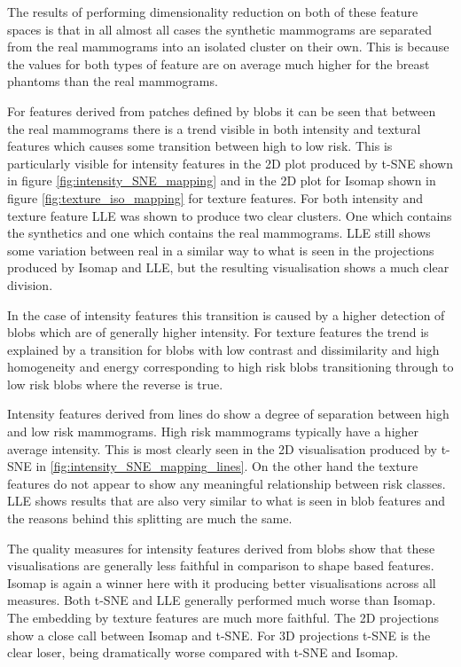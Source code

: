 The results of performing dimensionality reduction on both of these feature spaces is that in all almost all cases the synthetic mammograms are separated from the real mammograms into an isolated cluster on their own. This is because the values for both types of feature are on average much higher for the breast phantoms than the real mammograms.

For features derived from patches defined by blobs it can be seen that between the real mammograms there is a trend visible in both intensity and textural features which causes some transition between high to low risk. This is particularly visible for intensity features in the 2D plot produced by t-SNE shown in figure \ref{fig:intensity_SNE_mapping} and in the 2D plot for Isomap shown in figure \ref{fig:texture_iso_mapping} for texture features. For both intensity and texture feature LLE was shown to produce two clear clusters. One which contains the synthetics and one which contains the real mammograms. LLE still shows some variation between real in a similar way to what is seen in the projections produced by Isomap and LLE, but the resulting visualisation shows a much clear division.

In the case of intensity features this transition is caused by a higher detection of blobs which are of generally higher intensity. For texture features the trend is explained by a transition for blobs with low contrast and dissimilarity and high homogeneity and energy corresponding to high risk blobs transitioning through to low risk blobs where the reverse is true.

Intensity features derived from lines do show a degree of separation between high and low risk mammograms. High risk mammograms typically have a higher average intensity. This is most clearly seen in the 2D visualisation produced by t-SNE in \ref{fig:intensity_SNE_mapping_lines}. On the other hand the texture features do not appear to show any meaningful relationship between risk classes. LLE shows results that are also very similar to what is seen in blob features and the reasons behind this splitting are much the same.

The quality measures for intensity features derived from blobs show that these visualisations are generally less faithful in comparison to shape based features. Isomap is again a winner here with it producing better visualisations across all measures. Both t-SNE and LLE generally performed much worse than Isomap. The embedding by texture features are much more faithful. The 2D projections show a close call between Isomap and t-SNE. For 3D projections t-SNE is the clear loser, being dramatically worse compared with t-SNE and Isomap.

